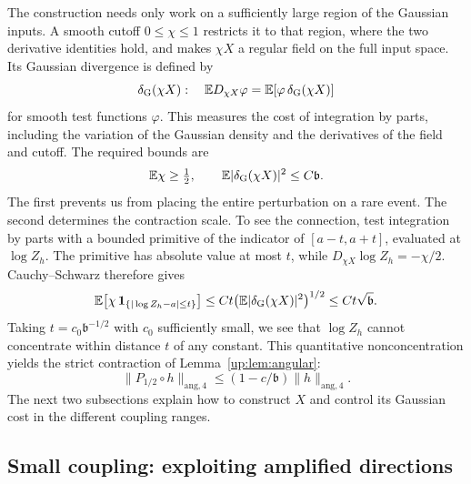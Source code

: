 \documentclass[11pt]{article}
\numberwithin{equation}{section}
\theoremstyle{remark}
\newcommand{\E}{\mathbb E}
\begin{document}
The construction needs only work on a sufficiently large region of
the Gaussian inputs. A smooth cutoff $0\le\chi\le1$ restricts it
to that region, where the two derivative identities hold, and makes
$\chi X$ a regular field on the full input space. Its Gaussian
divergence is defined by
\[\delta_{\rm G}(\chi X):\quad 
 \E D_{\chi X}\varphi
 =\E[\varphi\,\delta_{\rm G}(\chi X)]
\]
for smooth test functions $\varphi$. This measures the cost of
integration by parts, including the variation of the Gaussian
density and the derivatives of the field and cutoff. The required
bounds are
\[
 \E\chi\ge\tfrac12,\qquad
 \E|\delta_{\rm G}(\chi X)|^2\le C\mathfrak b.
\]
The first prevents us from placing the entire perturbation on a
rare event. The second determines the contraction scale. To see the connection, test integration by parts with a bounded
primitive of the indicator of $[a-t,a+t]$, evaluated at $\log Z_h$.
The primitive has absolute value at most $t$, while
$D_{\chi X}\log Z_h=-\chi/2$. Cauchy--Schwarz therefore gives
\[
 \E\!\left[\chi\,\mathbf1_{\{|\log Z_h-a|\le t\}}\right]
 \le Ct\bigl(\E|\delta_{\rm G}(\chi X)|^2\bigr)^{1/2}
 \le Ct\sqrt{\mathfrak b}.
\]
Taking $t=c_0\mathfrak b^{-1/2}$ with $c_0$ sufficiently small,
we see that $\log Z_h$ cannot concentrate within distance $t$ of
any constant. This quantitative nonconcentration yields the strict
contraction of Lemma~\ref{up:lem:angular}:
\[
 \|P_{1/2}\circ h\|_{\mathrm{ang},4}
 \le(1-c/\mathfrak b)\|h\|_{\mathrm{ang},4}.
\]
The next two subsections explain how to construct $X$ and control
its Gaussian cost in the different coupling ranges.

\subsection{Small coupling: exploiting amplified directions}
\label{sec:intro-small-fields}
 
\end{document}
